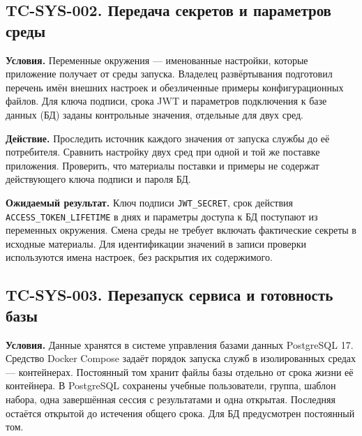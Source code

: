 \documentclass[12pt,a4paper]{article}
\begin{document}
\subsection{TC-SYS-002. Передача секретов и параметров среды}\label{tc-sys-002-ux43fux435ux440ux435ux434ux430ux447ux430-ux441ux435ux43aux440ux435ux442ux43eux432-ux438-ux43fux430ux440ux430ux43cux435ux442ux440ux43eux432-ux441ux440ux435ux434ux44b}

\hypertarget{tc-sys-002-передача-секретов-и-параметров-среды}{}

\hypertarget{tc-sys-002}{}

\textbf{Условия.} Переменные окружения --- именованные настройки, которые приложение получает от среды запуска. Владелец развёртывания подготовил перечень имён внешних настроек и обезличенные примеры конфигурационных файлов. Для ключа подписи, срока JWT и параметров подключения к базе данных (БД) заданы контрольные значения, отдельные для двух сред.

\textbf{Действие.} Проследить источник каждого значения от запуска службы до её потребителя. Сравнить настройку двух сред при одной и той же поставке приложения. Проверить, что материалы поставки и примеры не содержат действующего ключа подписи и пароля БД.

\textbf{Ожидаемый результат.} Ключ подписи \texttt{JWT\_SECRET}, срок действия \texttt{ACCESS\_\allowbreak{}TOKEN\_\allowbreak{}LIFETIME} в днях и параметры доступа к БД поступают из переменных окружения. Смена среды не требует включать фактические секреты в исходные материалы. Для идентификации значений в записи проверки используются имена настроек, без раскрытия их содержимого.

\subsection{TC-SYS-003. Перезапуск сервиса и готовность базы}\label{tc-sys-003-ux43fux435ux440ux435ux437ux430ux43fux443ux441ux43a-ux441ux435ux440ux432ux438ux441ux430-ux438-ux433ux43eux442ux43eux432ux43dux43eux441ux442ux44c-ux431ux430ux437ux44b}

\hypertarget{tc-sys-003-перезапуск-сервиса-и-готовность-базы}{}

\hypertarget{tc-sys-003}{}

\textbf{Условия.} Данные хранятся в системе управления базами данных PostgreSQL 17. Средство Docker Compose задаёт порядок запуска служб в изолированных средах --- контейнерах. Постоянный том хранит файлы базы отдельно от срока жизни её контейнера. В PostgreSQL сохранены учебные пользователи, группа, шаблон набора, одна завершённая сессия с результатами и одна открытая. Последняя остаётся открытой до истечения общего срока. Для БД предусмотрен постоянный том.
\end{document}
